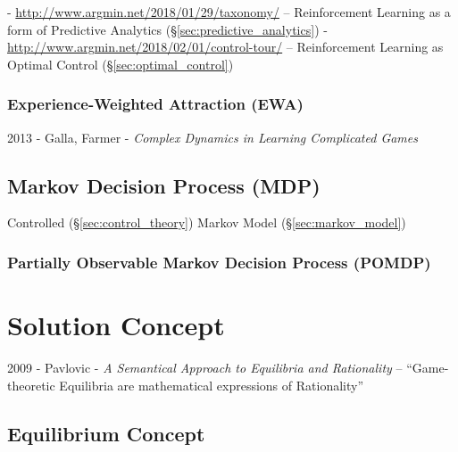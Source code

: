 - \url{http://www.argmin.net/2018/01/29/taxonomy/} --
  Reinforcement Learning as a form of Predictive Analytics
  (\S\ref{sec:predictive_analytics})
- \url{http://www.argmin.net/2018/02/01/control-tour/} --
  Reinforcement Learning as Optimal Control (\S\ref{sec:optimal_control})



\subsubsection{Experience-Weighted Attraction (EWA)}\label{sec:ewa}

2013 - Galla, Farmer - \emph{Complex Dynamics in Learning Complicated Games}



\subsection{Markov Decision Process (MDP)}\label{sec:mdp}

Controlled (\S\ref{sec:control_theory}) Markov Model (\S\ref{sec:markov_model})



\subsubsection{Partially Observable Markov Decision Process (POMDP)}
\label{sec:pomdp}



\section{Solution Concept}\label{sec:solution_concept}

2009 - Pavlovic - \emph{A Semantical Approach to Equilibria and Rationality} --
``Game-theoretic Equilibria are mathematical expressions of Rationality''



\subsection{Equilibrium Concept}\label{sec:equilibrium_concept}

